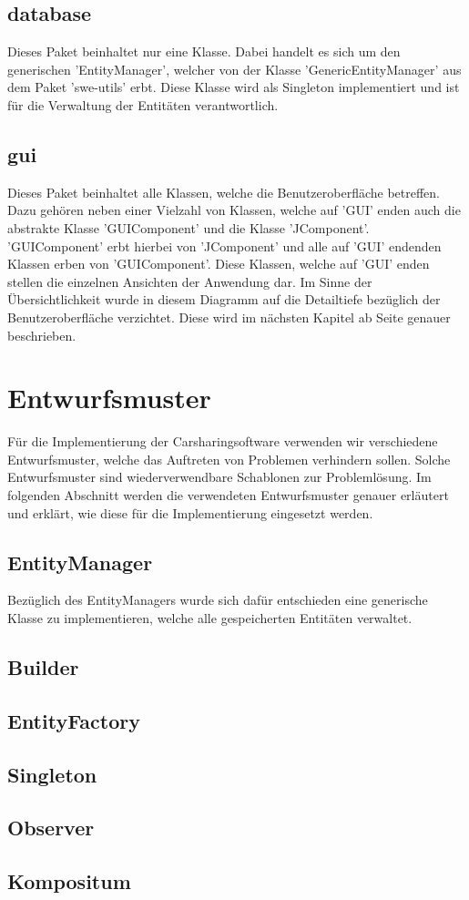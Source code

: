 \subsection{database}
Dieses Paket beinhaltet nur eine Klasse. Dabei handelt es sich um den generischen 'EntityManager', welcher von der Klasse 'GenericEntityManager' aus dem Paket 'swe-utils' erbt. Diese Klasse wird als Singleton implementiert und ist für die Verwaltung der Entitäten verantwortlich.

\subsection{gui}
Dieses Paket beinhaltet alle Klassen, welche die Benutzeroberfläche betreffen. Dazu gehören neben einer Vielzahl von Klassen, welche auf 'GUI' enden auch die abstrakte Klasse 'GUIComponent' und die Klasse 'JComponent'. 'GUIComponent' erbt hierbei von 'JComponent' und alle auf 'GUI' endenden Klassen erben von 'GUIComponent'. Diese Klassen, welche auf 'GUI' enden stellen die einzelnen Ansichten der Anwendung dar. Im Sinne der Übersichtlichkeit wurde in diesem Diagramm auf die Detailtiefe bezüglich der Benutzeroberfläche verzichtet. Diese wird im nächsten Kapitel ab Seite \pageref{chapter:gui} genauer beschrieben.

\section{Entwurfsmuster}
Für die Implementierung der Carsharingsoftware verwenden wir verschiedene Entwurfsmuster, welche das Auftreten von Problemen verhindern sollen. Solche Entwurfsmuster sind wiederverwendbare Schablonen zur Problemlösung. Im folgenden Abschnitt werden die verwendeten Entwurfsmuster genauer erläutert und erklärt, wie diese für die Implementierung eingesetzt werden. 

\subsection{EntityManager}
Bezüglich des EntityManagers wurde sich dafür entschieden eine generische Klasse zu implementieren, welche alle gespeicherten Entitäten verwaltet. 

\subsection{Builder}

\subsection{EntityFactory}

\subsection{Singleton}

\subsection{Observer}

\subsection{Kompositum}